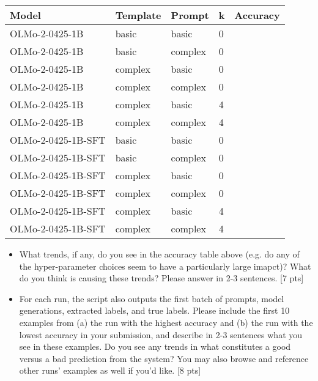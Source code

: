 \documentclass[11pt]{article}
\begin{document}
\begin{table}[h]
  \centering
\begin{tabular}{@{}lllll@{}}
\toprule
Model              & Template & Prompt  & k & Accuracy \\ \midrule
OLMo-2-0425-1B     & basic    & basic   & 0 &          \\
OLMo-2-0425-1B     & basic    & complex & 0 &          \\
OLMo-2-0425-1B     & complex  & basic   & 0 &          \\
OLMo-2-0425-1B     & complex  & complex & 0 &          \\
OLMo-2-0425-1B     & complex  & basic   & 4 &          \\
OLMo-2-0425-1B     & complex  & complex & 4 &          \\
OLMo-2-0425-1B-SFT & basic    & basic   & 0 &          \\
OLMo-2-0425-1B-SFT & basic    & complex & 0 &          \\
OLMo-2-0425-1B-SFT & complex  & basic   & 0 &          \\
OLMo-2-0425-1B-SFT & complex  & complex & 0 &          \\
OLMo-2-0425-1B-SFT & complex  & basic   & 4 &          \\
OLMo-2-0425-1B-SFT & complex  & complex & 4 &          \\ \bottomrule
\end{tabular}
\end{table}

\vspace{2em}
\begin{itemize}
  \item What trends, if any, do you see in the accuracy table above (e.g. do any of the hyper-parameter choices seem to have a particularly large imapct)?  What do you think is causing these trends?  Please answer in 2-3 sentences. \hfill [7 pts]
  \item For each run, the script also outputs the first batch of prompts, model generations, extracted labels, and true labels.  Please include the first 10 examples from (a) the run with the highest accuracy and (b) the run with the lowest accuracy in your submission, and describe in 2-3 sentences what you see in these examples.  Do you see any trends in what constitutes a good versus a bad prediction from the system?   You may also browse and reference other runs' examples as well if you'd like. \hfill [8 pts]
\end{itemize}
\end{document}
